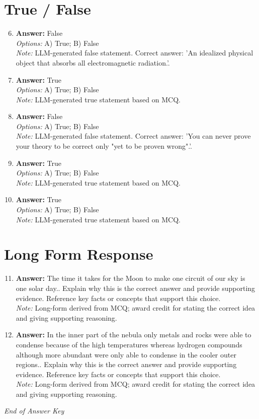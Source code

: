 \documentclass[12pt]{article}
\begin{document}
\section*{True / False}
\begin{enumerate}[label=\arabic*.]
\setcounter{enumi}{5}
\item \textbf{Answer:} False
\\ \textit{Options:} A) True; B) False
\\ \textit{Note:} LLM-generated false statement. Correct answer: 'An idealized physical object that absorbs all electromagnetic radiation.'.
\item \textbf{Answer:} True
\\ \textit{Options:} A) True; B) False
\\ \textit{Note:} LLM-generated true statement based on MCQ.
\item \textbf{Answer:} False
\\ \textit{Options:} A) True; B) False
\\ \textit{Note:} LLM-generated false statement. Correct answer: 'You can never prove your theory to be correct only "yet to be proven wrong".'.
\item \textbf{Answer:} True
\\ \textit{Options:} A) True; B) False
\\ \textit{Note:} LLM-generated true statement based on MCQ.
\item \textbf{Answer:} True
\\ \textit{Options:} A) True; B) False
\\ \textit{Note:} LLM-generated true statement based on MCQ.
\end{enumerate}

\section*{Long Form Response}
\begin{enumerate}[label=\arabic*.]
\setcounter{enumi}{10}
\item \textbf{Answer:} The time it takes for the Moon to make one circuit of our sky is one solar day.. Explain why this is the correct answer and provide supporting evidence. Reference key facts or concepts that support this choice.
\\ \textit{Note:} Long-form derived from MCQ; award credit for stating the correct idea and giving supporting reasoning.
\item \textbf{Answer:} In the inner part of the nebula only metals and rocks were able to condense because of the high temperatures whereas hydrogen compounds although more abundant were only able to condense in the cooler outer regions.. Explain why this is the correct answer and provide supporting evidence. Reference key facts or concepts that support this choice.
\\ \textit{Note:} Long-form derived from MCQ; award credit for stating the correct idea and giving supporting reasoning.
\end{enumerate}

\vfill
\noindent\textit{End of Answer Key}
\end{document}
